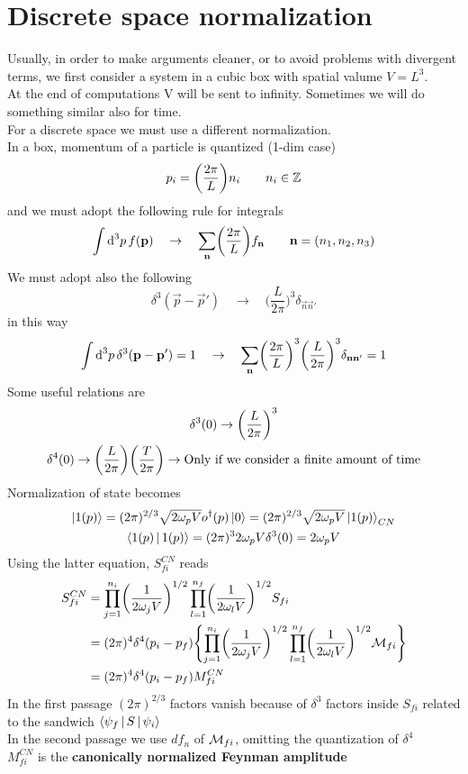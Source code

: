\section{Discrete space normalization}
Usually, in order to make arguments cleaner, or to avoid problems with divergent terms, we first consider a system in a cubic box with spatial valume $V = L^3$.\\
At the end of computations V will be sent to infinity. Sometimes we will do something similar also for time.\\
For a discrete space we must use a different normalization.\\
In a box, momentum of a particle is quantized (1-dim case)
\[
p_i = \biggl( \frac{2 \pi}{L} \biggr) n_i \qquad n_i \in \mathbb{Z}
\]
and we must adopt the following rule for integrals
\[
\int \textup{d}^3 p \, f(\mathbf{p}) \quad \to \quad \sum_{\mathbf{n}} \biggr( \frac{2 \pi}{L} \biggl) f_{\mathbf{n}}
\qquad \mathbf{n} = (n_1, n_2, n_3)
\]
We must adopt also the following
\[
\delta^3 (\vec{p} - \vec{p}')
\quad \to \quad
\biggl( \frac{L}{2 \pi} \biggr)^3 \delta_{\vec{n}\vec{n}'}
\]
in this way
\[
\int \textup{d}^3p \, \delta^3 (\mathbf{p} - \mathbf{p}') = 1
\quad \to \quad
\sum_{\mathbf{n}} \biggl( \frac{2 \pi}{L} \biggr)^3 \biggl( \frac{L}{2 \pi} \biggr)^3 \delta_{\mathbf{n}\mathbf{n}'} = 1
\]
Some useful relations are
\begin{gather}
\delta^3(0) \to \biggl( \frac{L}{2 \pi} \biggr)^3 \notag \\
\delta^4 (0) \to \biggl( \frac{L}{2 \pi} \biggr) \biggl( \frac{T}{2 \pi} \biggr)
\to \textup{Only if we consider a finite amount of time} \notag
\end{gather}
Normalization of state becomes 
\begin{gather}
\Ket{1(p)} = (2 \pi)^{2/3} \sqrt{2 \omega_p V} o^{\dagger}(p) \Ket{0}
= (2 \pi)^{2/3} \sqrt{2 \omega_p V} \Ket{1(p)}_{CN} \notag \\
\Braket{1(p) | 1(p)} = (2 \pi)^3 2 \omega_p V \delta^3(0) = 2 \omega_p V \notag
\end{gather}
Using the latter equation, $S_{fi}^{CN}$ reads
\[
\begin{split}
S_{fi}^{CN}	& = \prod_{j=1}^{n_i} \biggl( \frac{1}{2 \omega_j V} \biggr)^{1/2} \prod_{l=1}^{n_f} \biggl( \frac{1}{2\omega_l V} \biggr)^{1/2} S_{fi}\\
			& = (2 \pi)^4 \delta^4 (p_i - p_f)
				\Biggl\{ \prod_{j=1}^{n_i} \biggl( \frac{1}{2 \omega_j V} \biggr)^{1/2}
					    \prod_{l=1}^{n_f} \biggl( \frac{1}{2 \omega_l V} \biggr)^{1/2}
				\mathcal{M}_{fi} \Biggr\} \\
			& = (2 \pi)^4 \delta^4 (p_i - p_f) M_{fi}^{CN}
\end{split}
\]
In the first passage $(2 \pi)^{2/3}$ factors vanish because of $\delta^3$ factors inside $S_{fi}$ related to the sandwich $\Braket{\psi_f | S | \psi_i}$\\
In the second passage we use $d f_n$ of $\mathcal{M}_{fi}$, omitting the quantization of $\delta^4$\\
$M_{fi}^{CN}$ is the \textbf{canonically normalized Feynman amplitude}